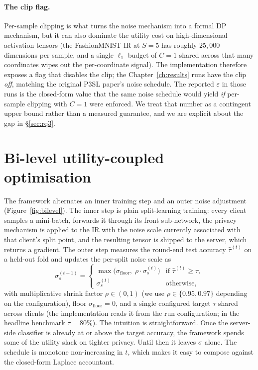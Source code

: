 \documentclass[11pt,a4paper,oneside]{report}
\begin{document}
\paragraph{The clip flag.}
\label{sec:clipflag}
Per-sample clipping is what turns the noise mechanism into a formal
DP mechanism, but it can also dominate the utility cost on
high-dimensional activation tensors (the FashionMNIST IR at
$S{=}5$ has roughly $25{,}000$ dimensions per sample, and a single
$\ell_1$ budget of $C{=}1$ shared across that many coordinates wipes
out the per-coordinate signal). The implementation therefore exposes
a flag that disables the clip; the Chapter~\ref{ch:results} runs
have the clip \emph{off}, matching the original P3SL paper's noise
schedule. The reported $\varepsilon$ in those runs is the
closed-form value that the same noise schedule would yield
\emph{if} per-sample clipping with $C{=}1$ were enforced. We treat
that number as a contingent upper bound rather than a measured
guarantee, and we are explicit about the gap in
\S\ref{sec:rq3}.

\section{Bi-level utility-coupled optimisation}

The framework alternates an inner training step and an outer noise
adjustment (Figure~\ref{fig:bilevel}). The inner step is plain
split-learning training: every client samples a mini-batch, forwards
it through its front sub-network, the privacy mechanism is applied to
the IR with the noise scale currently associated with that client's
split point, and the resulting tensor is shipped to the server, which
returns a gradient. The outer step measures the round-end test
accuracy $\hat{\tau}^{(t)}$ on a held-out fold and updates the
per-split noise scale as
\begin{equation}
 \sigma_s^{(t+1)} =
 \begin{cases}
 \max\bigl(\sigma_{\mathrm{floor}},\; \rho \cdot \sigma_s^{(t)}\bigr)
 & \text{if } \hat{\tau}^{(t)} \geq \tau,\\
 \sigma_s^{(t)} & \text{otherwise},
 \end{cases}
 \label{eq:bilevel}
\end{equation}
with multiplicative shrink factor $\rho \in (0, 1)$ (we use
$\rho \in \{0.95, 0.97\}$ depending on the configuration), floor
$\sigma_{\mathrm{floor}} = 0$, and a single configured target $\tau$
shared across clients (the implementation reads it from the run
configuration; in the headline benchmark $\tau = 80\%$). The
intuition is straightforward. Once the server-side classifier is
already at or above the target accuracy, the framework spends some
of the utility slack on tighter privacy. Until then it leaves
$\sigma$ alone. The schedule is monotone non-increasing in $t$, which
makes it easy to compose against the closed-form Laplace accountant.
\end{document}
